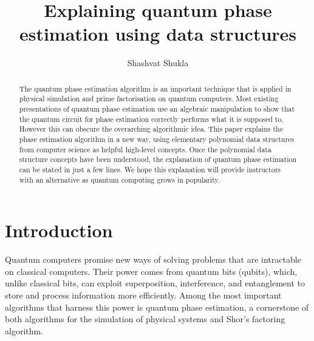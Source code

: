 \documentclass[12pt, a4paper]{article}
\title{Explaining quantum phase estimation using data structures}
\author{Shashvat Shukla}
\begin{document}
	
\maketitle
	
\begin{abstract}
	The quantum phase estimation algorithm is an important technique that is applied in physical simulation and prime factorisation on quantum computers. 
	Most existing presentations of quantum phase estimation use an algebraic manipulation to show that the quantum circuit for phase estimation correctly performs what it is supposed to. However this can obscure the overarching algorithmic idea.
	This paper explains the phase estimation algorithm in a new way, using elementary polynomial data structures from computer science as helpful high-level concepts. 
	Once the polynomial data structure concepts have been understood, the explanation of quantum phase estimation can be stated in just a few lines.
	We hope this explanation will provide instructors with an alternative as quantum computing grows in popularity.
\end{abstract}

\section{Introduction}


	
Quantum computers promise new ways of solving problems that are intractable on classical computers. Their power comes from quantum bits (qubits), which, unlike classical bits, can exploit superposition, interference, and entanglement to store and process information more efficiently. Among the most important algorithms that harness this power is quantum phase estimation, a cornerstone of both algorithms for the simulation of physical systems and Shor’s factoring algorithm.
\end{document}
